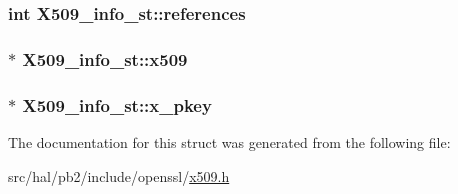 \subsubsection[{\texorpdfstring{references}{references}}]{\setlength{\rightskip}{0pt plus 5cm}int X509\+\_\+info\+\_\+st\+::references}\hypertarget{struct_x509__info__st_ab5653bf99a3d84cffed5ec7c52da92e3}{}\label{struct_x509__info__st_ab5653bf99a3d84cffed5ec7c52da92e3}
\subsubsection[{\texorpdfstring{x509}{x509}}]{$\ast$ X509\+\_\+info\+\_\+st\+::x509}\hypertarget{struct_x509__info__st_ab25bba431636552ba16640f61c42668c}{}\label{struct_x509__info__st_ab25bba431636552ba16640f61c42668c}
\subsubsection[{\texorpdfstring{x\+\_\+pkey}{x_pkey}}]{$\ast$ X509\+\_\+info\+\_\+st\+::x\+\_\+pkey}\hypertarget{struct_x509__info__st_a06456585da668d208076cf6385f177aa}{}\label{struct_x509__info__st_a06456585da668d208076cf6385f177aa}


The documentation for this struct was generated from the following file\+:\begin{DoxyCompactItemize}
\item 
src/hal/pb2/include/openssl/\hyperlink{x509_8h}{x509.\+h}\end{DoxyCompactItemize}
